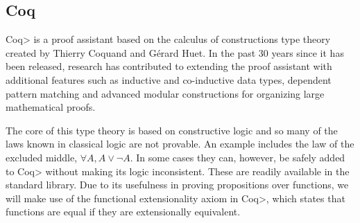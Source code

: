 \subsection{Coq}

\<Coq> is a proof assistant based on the calculus of constructions type theory created by Thierry Coquand and G\'{e}rard Huet\cite{Coquand1988}.
In the past 30 years since it has been released, research has contributed to extending the proof assistant with additional features such as inductive and co-inductive data types\cite{Coquand1990}, dependent pattern matching\cite{Sozeau2010} and advanced modular constructions for organizing large mathematical proofs\cite{Sozeau2008}\cite{Mahboubi2013}.

The core of this type theory is based on constructive logic and so many of the laws known in classical logic are not provable.
An example includes the law of the excluded middle, $\forall A, A \vee \neg A$.
In some cases they can, however, be safely added to \<Coq> without making its logic inconsistent. These are readily available in the standard library.
Due to its usefulness in proving propositions over functions, we will make use of the functional extensionality axiom in \<Coq>, which states that functions are equal if they are extensionally equivalent.




